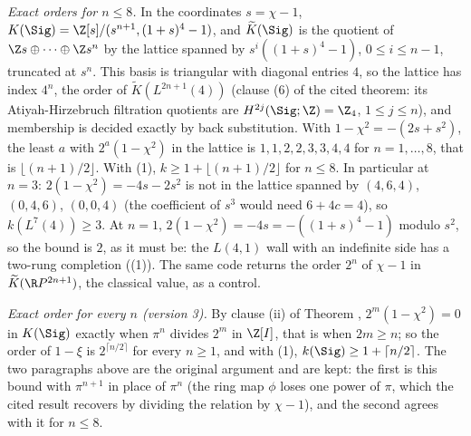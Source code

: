 \emph{Exact orders for $n \leq 8$.} In the coordinates $s = \chi - 1$, $K(\Sig) = \Z[s]/(s^{n+1}, (1+s)^{4} - 1)$, and $\widetilde K(\Sig)$ is the quotient of $\Z s \oplus \dots \oplus \Z s^{n}$ by the lattice spanned by $s^{i}((1+s)^{4} - 1)$, $0 \leq i \leq n - 1$, truncated at $s^{n}$. This basis is triangular with diagonal entries $4$, so the lattice has index $4^{n}$, the order of $\widetilde K(L^{2n+1}(4))$ (clause (6) of the cited theorem: its Atiyah-Hirzebruch filtration quotients are $H^{2j}(\Sig; \Z) = \Z_{4}$, $1 \leq j \leq n$), and membership is decided exactly by back substitution. With $1 - \chi^{2} = -(2s + s^{2})$, the least $a$ with $2^{a}(1 - \chi^{2})$ in the lattice is $1, 1, 2, 2, 3, 3, 4, 4$ for $n = 1, \dots, 8$, that is $\lfloor (n+1)/2 \rfloor$. With (1), $k \geq 1 + \lfloor (n+1)/2 \rfloor$ for $n \leq 8$. In particular at $n = 3$: $2(1 - \chi^{2}) = -4s - 2s^{2}$ is not in the lattice spanned by $(4,6,4)$, $(0,4,6)$, $(0,0,4)$ (the coefficient of $s^{3}$ would need $6 + 4c = 4$), so $k(L^{7}(4)) \geq 3$. At $n = 1$, $2(1 - \chi^{2}) = -4s = -((1+s)^{4} - 1)$ modulo $s^{2}$, so the bound is $2$, as it must be: the $L(4,1)$ wall with an indefinite side has a two-rung completion ((1)). The same code returns the order $2^{n}$ of $\chi - 1$ in $\widetilde K(\R P^{2n+1})$, the classical value, as a control.

\emph{Exact order for every $n$ (version 3).} By clause (ii) of Theorem , $2^{m}(1 - \chi^{2}) = 0$ in $K(\Sig)$ exactly when $\pi^{n}$ divides $2^{m}$ in $\Z[I]$, that is when $2m \geq n$; so the order of $1 - \xi$ is $2^{\lceil n/2 \rceil}$ for every $n \geq 1$, and with (1), $k(\Sig) \geq 1 + \lceil n/2 \rceil$. The two paragraphs above are the original argument and are kept: the first is this bound with $\pi^{n+1}$ in place of $\pi^{n}$ (the ring map $\phi$ loses one power of $\pi$, which the cited result recovers by dividing the relation by $\chi - 1$), and the second agrees with it for $n \leq 8$.


